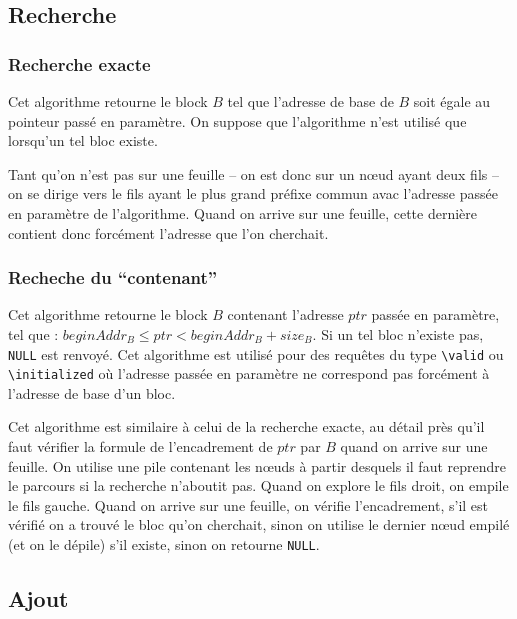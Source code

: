 \documentclass[french]{spimufcphdthesis}
\begin{document}
\subsection{Recherche}



\subsubsection{Recherche exacte}

Cet algorithme retourne le block $B$ tel que l'adresse de base de $B$ soit égale
au pointeur passé en paramètre. On suppose que l'algorithme n'est utilisé que
lorsqu'un tel bloc existe.

Tant qu'on n'est pas sur une feuille -- on est donc sur un n\oe{}ud ayant deux
fils
-- on se dirige vers le fils ayant le plus grand préfixe commun avac l'adresse
passée en paramètre de l'algorithme. Quand on arrive sur une feuille, cette
dernière contient donc forcément l'adresse que l'on cherchait.

\subsubsection{Recheche du ``contenant''}

Cet algorithme retourne le block $B$ contenant l'adresse $ptr$ passée en
paramètre, tel que : $beginAddr_B \le ptr < beginAddr_B + size_B$. Si un tel
bloc n'existe pas, \lstinline{NULL} est renvoyé. Cet algorithme est utilisé pour
des requêtes du type \lstinline{\valid} ou \lstinline{\initialized} où
l'adresse passée en paramètre ne correspond pas forcément à l'adresse de base
d'un bloc.

Cet algorithme est similaire à celui de la recherche exacte, au détail près
qu'il faut vérifier la formule de l'encadrement de $ptr$ par $B$ quand on arrive
sur une feuille. On utilise une pile contenant les n\oe{}uds à partir desquels
il
faut reprendre le parcours si la recherche n'aboutit pas. Quand on explore le
fils droit, on empile le fils gauche. Quand on arrive sur une feuille, on
vérifie l'encadrement, s'il est vérifié on a trouvé le bloc qu'on cherchait,
sinon on utilise le dernier n\oe{}ud empilé (et on le dépile) s'il existe, sinon
on retourne \lstinline{NULL}.

\subsection{Ajout}
\end{document}
